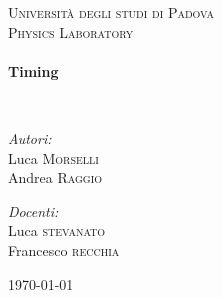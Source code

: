 \begin{titlepage}
\begin{center}


\textsc{\LARGE Università degli studi di Padova}\\[1.5cm]

\textsc{\Large Physics Laboratory}\\[0.5cm]

\HRule \\[0.4cm]
{ \huge \bfseries Timing\\ [0.4cm] }

\HRule \\[1.5cm]

\noindent
\begin{minipage}{0.4\textwidth}
\begin{flushleft} \large
\emph{Autori:}\\
Luca \textsc{Morselli}\\
Andrea \textsc{Raggio}\\
\end{flushleft}
\end{minipage}%
\begin{minipage}{0.4\textwidth}
\begin{flushright} \large
\emph{Docenti:} \\
Luca \textsc{stevanato}\\
Francesco \textsc{recchia}\\
\end{flushright}
\end{minipage}

\vfill

{\large \today}

\end{center}
\end{titlepage}
